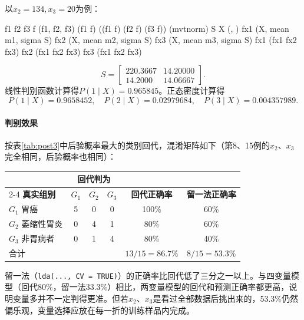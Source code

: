 以$x_2=134,x_3=20$为例：
\begin{code}
f1 \ROperator{<-}  \ROperator{*}  \ROperator{+}  \ROperator{*}  \ROperator{-} 
f2 \ROperator{<-}  \ROperator{*}  \ROperator{-}  \ROperator{*}  \ROperator{-} 
f3 \ROperator{<-}  \ROperator{*}  \ROperator{-}  \ROperator{*}  \ROperator{-} 
f \ROperator{<-} (f1, f2, f3)                  
(f1 \ROperator{-} f) \ROperator{/} ((f1 \ROperator{-} f) \ROperator{+} (f2 \ROperator{-} f) \ROperator{+} (f3 \ROperator{-} f))
(mvtnorm)                        
S
X \ROperator{<-} (, )
fx1 \ROperator{<-} (X, mean \ROperator{=} m1, sigma \ROperator{=} S)
fx2 \ROperator{<-} (X, mean \ROperator{=} m2, sigma \ROperator{=} S)
fx3 \ROperator{<-} (X, mean \ROperator{=} m3, sigma \ROperator{=} S)
fx1 \ROperator{/} (fx1 \ROperator{+} fx2 \ROperator{+} fx3)
fx2 \ROperator{/} (fx1 \ROperator{+} fx2 \ROperator{+} fx3)
fx3 \ROperator{/} (fx1 \ROperator{+} fx2 \ROperator{+} fx3)
\end{code}
\[
S=\begin{bmatrix}220.3667&14.20000\\14.2000&14.06667\end{bmatrix}.
\]
线性判别函数计算得$P(1\mid X)=0.965845$。正态密度计算得
\[
P(1\mid X)=0.9658452,\quad P(2\mid X)=0.02979684,\quad P(3\mid X)=0.004357989.
\]
\paragraph{判别效果} 按表\ref{tab:post3}中后验概率最大的类别回代，混淆矩阵如下（第8、15例的$x_2$、$x_3$完全相同，后验概率也相同）：
\begin{center}\small\begin{tabular}{lccccc}\toprule
&\multicolumn{3}{c}{\bfseries 回代判为}&&\\\cmidrule(lr){2-4}
{\bfseries 真实组别}&$G_1$&$G_2$&$G_3$&{\bfseries 回代正确率}&{\bfseries 留一法正确率}\\\midrule
$G_1$ 胃癌&5&0&0&100\%&60\%\\
$G_2$ 萎缩性胃炎&0&4&1&80\%&60\%\\
$G_3$ 非胃病者&0&1&4&80\%&40\%\\\midrule
合计&&&&$13/15=86.7\%$&$8/15=53.3\%$\\\bottomrule
\end{tabular}\end{center}
留一法（\texttt{lda(..., CV = TRUE)}）的正确率比回代低了三分之一以上。与四变量模型（回代80\%，留一法33.3\%）相比，两变量模型的回代和预测正确率都更高，说明变量多并不一定判得更准。但若$x_2$、$x_3$是看过全部数据后挑出来的，53.3\%仍然偏乐观，变量选择应放在每一折的训练样品内完成。
